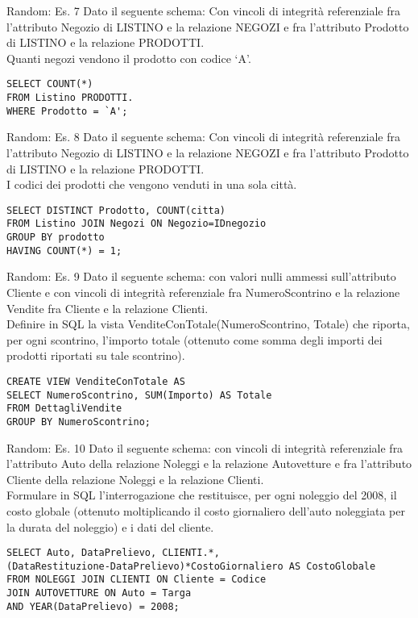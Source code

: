 %
\begin{frame}[fragile]{Random: Es. 7}
Dato il seguente schema:
\schemaNegoziProdottiListino
Con vincoli di integrit\`a referenziale fra l'attributo Negozio di LISTINO e la relazione NEGOZI e fra l'attributo Prodotto di LISTINO e la relazione PRODOTTI.
\newline
\\Quanti negozi vendono il prodotto con codice `A'.
\pause
\begin{lstlisting}
SELECT COUNT(*)
FROM Listino PRODOTTI.
WHERE Prodotto = `A';
\end{lstlisting}
\end{frame}
%
\begin{frame}[fragile]{Random: Es. 8}
Dato il seguente schema:
\schemaNegoziProdottiListino
Con vincoli di integrit\`a referenziale fra l'attributo Negozio di LISTINO e la relazione NEGOZI e fra l'attributo Prodotto di LISTINO e la relazione PRODOTTI.
\newline
\\I codici dei prodotti che vengono venduti in una sola citt\`a.
\pause
\begin{lstlisting}
SELECT DISTINCT Prodotto, COUNT(citta)
FROM Listino JOIN Negozi ON Negozio=IDnegozio
GROUP BY prodotto
HAVING COUNT(*) = 1;
\end{lstlisting}
\end{frame}
%
\begin{frame}[fragile]{Random: Es. 9}
Dato il seguente schema:
\schemaVenditeClientiDettagliVendite
con valori nulli ammessi sull'attributo Cliente e con vincoli di integrit\`a referenziale fra NumeroScontrino e la relazione Vendite fra Cliente e la relazione Clienti.
\newline
\\Definire in SQL la vista VenditeConTotale(NumeroScontrino, Totale) che riporta, per ogni scontrino, l'importo totale (ottenuto come somma degli importi dei prodotti riportati su tale scontrino).
\pause
\begin{lstlisting}
CREATE VIEW VenditeConTotale AS
SELECT NumeroScontrino, SUM(Importo) AS Totale
FROM DettagliVendite
GROUP BY NumeroScontrino;
\end{lstlisting}
\end{frame}
%
\begin{frame}[fragile]{Random: Es. 10}
Dato il seguente schema:
\schemaClientiNoleggiAuto
con vincoli di integrit\`a referenziale fra l'attributo Auto della relazione Noleggi e la relazione Autovetture e fra l'attributo Cliente della relazione Noleggi e la relazione Clienti.
\newline
\\Formulare in SQL l'interrogazione che restituisce, per ogni noleggio del 2008, il costo globale (ottenuto moltiplicando il costo giornaliero dell'auto noleggiata per la durata del noleggio) e i dati del cliente.
\pause
\begin{lstlisting}
SELECT Auto, DataPrelievo, CLIENTI.*, 
(DataRestituzione-DataPrelievo)*CostoGiornaliero AS CostoGlobale
FROM NOLEGGI JOIN CLIENTI ON Cliente = Codice
JOIN AUTOVETTURE ON Auto = Targa
AND YEAR(DataPrelievo) = 2008;    
\end{lstlisting}
\end{frame}
